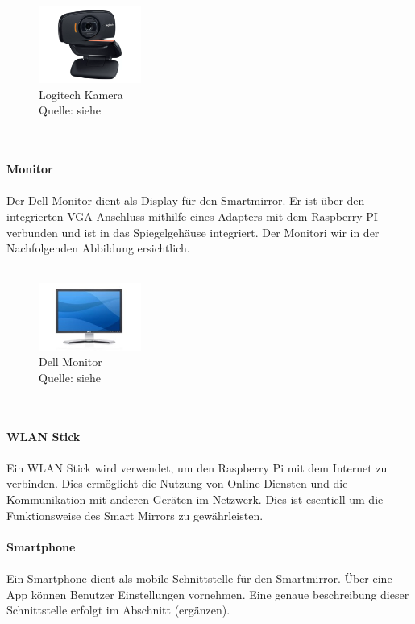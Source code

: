 \noindent
\begin{figure}[h]
    \centering
    \includegraphics[width=0.3\textwidth]{pictures/logitech_kamera.png}
  \captionsetup{justification=centering, labelformat=simple, singlelinecheck=false}
    \caption[Logitech Kamera]{Logitech Kamera\\ Quelle: siehe \cite{logitech_camera}}
\end{figure} \\ \\
\noindent
\textbf{Monitor} \\ \\
Der Dell Monitor dient als Display für den Smartmirror. Er ist über den integrierten VGA Anschluss mithilfe eines Adapters mit dem Raspberry PI verbunden und ist in das Spiegelgehäuse integriert. Der Monitori wir in der Nachfolgenden Abbildung ersichtlich. \\ \\
\noindent
\begin{figure}[h]
    \centering
    \includegraphics[width=0.3\textwidth]{pictures/dell_monitor.jpg}
  \captionsetup{justification=centering, labelformat=simple, singlelinecheck=false}
    \caption[Dell Monitor]{Dell Monitor\\ Quelle:  siehe \cite{dell_monitor}}
\end{figure} \\ \\
\noindent
\textbf{WLAN Stick} \\ \\
Ein WLAN Stick wird verwendet, um den Raspberry Pi mit dem Internet zu verbinden. Dies ermöglicht die Nutzung von Online-Diensten und die Kommunikation mit anderen Geräten im Netzwerk. Dies ist esentiell um die Funktionsweise des Smart Mirrors zu gewährleisten. \\ \\
\noindent
\textbf{Smartphone} \\ \\
Ein Smartphone dient als mobile Schnittstelle für den Smartmirror. Über eine App können Benutzer Einstellungen vornehmen. Eine genaue beschreibung dieser Schnittstelle erfolgt im Abschnitt (ergänzen). \\ \\
\noindent

